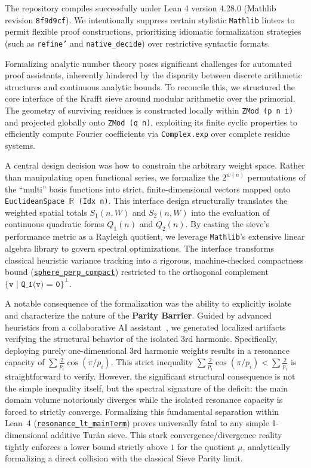 \documentclass[lean]{AFM}
\renewcommand{\.}{\hskip .75pt}
\def\urlpfx{https://github.com/ElNando888/KrafftSieve/blob/v1.2}
\begin{document}
The repository compiles successfully under Lean 4 version 4.28.0 (Mathlib revision \texttt{8f9d9cf}).
We intentionally suppress certain stylistic \texttt{Mathlib} linters to permit flexible proof
constructions, prioritizing idiomatic formalization strategies (such as \texttt{refine'} and
\texttt{native\_decide}) over restrictive syntactic formats.

Formalizing analytic number theory poses significant challenges for automated proof assistants,
inherently hindered by the disparity between discrete arithmetic structures and continuous analytic
bounds. To reconcile this, we structured the core interface of the Krafft sieve around modular
arithmetic over the primorial. The geometry of surviving residues is constructed locally within
\texttt{ZMod (p n i)} and projected globally onto \texttt{ZMod (q n)}, exploiting its finite cyclic
properties to efficiently compute Fourier coefficients via \texttt{Complex.exp} over complete
residue systems. 

A central design decision was how to constrain the arbitrary weight space. Rather than manipulating
open functional series, we formalize the $2^{w(n)}$ permutations of the ``multi'' basis functions
into strict, finite-dimensional vectors mapped onto \texttt{EuclideanSpace $\mathbb{R}$ (Idx n)}.
This interface design structurally translates the weighted spatial totals $S_1(n, W)$ and $S_2(n, W)$
into the evaluation of continuous quadratic forms $Q_1(n)$ and $Q_2(n)$. By casting the sieve's
performance metric as a Rayleigh quotient, we leverage \texttt{Mathlib}'s extensive linear algebra
library to govern spectral optimizations. The interface transforms classical heuristic variance
tracking into a rigorous, machine-checked compactness bound
(\href{\urlpfx/KrafftSieve/OptimalWeights.lean#L442}{\texttt{sphere\_perp\_compact}})
restricted to the orthogonal complement $\texttt{\{v | Q\_1(v) = 0\}}^{\perp}$.

A notable consequence of the formalization was the ability to explicitly isolate and characterize
the nature of the \textbf{Parity Barrier}. Guided by advanced heuristics from a collaborative AI
assistant~\cite{Achim2025}, we generated localized artifacts verifying the structural behavior
of the isolated 3rd harmonic. Specifically, deploying purely one-dimensional 3rd harmonic weights
results in a resonance capacity of $\sum \frac{2}{p_i} \cos(\pi/p_i)$. This strict inequality
$\sum \frac{2}{p_i}\cos(\pi/p_i) < \sum \frac{2}{p_i}$ is straightforward to verify. However,
the significant structural consequence is not the simple inequality itself, but the spectral
signature of the deficit: the main domain volume notoriously diverges while the isolated resonance
capacity is forced to strictly converge. Formalizing this fundamental separation within Lean~4
(\href{\urlpfx/KrafftSieve/ThirdHarmonic.lean#L806}{\texttt{resonance\_lt\_mainTerm}}) proves
universally fatal to any simple 1-dimensional additive Turán sieve. This stark
convergence/divergence reality tightly enforces a lower bound strictly above $1$ for the quotient
$\mu$, analytically formalizing a direct collision with the classical Sieve Parity limit.
\end{document}
